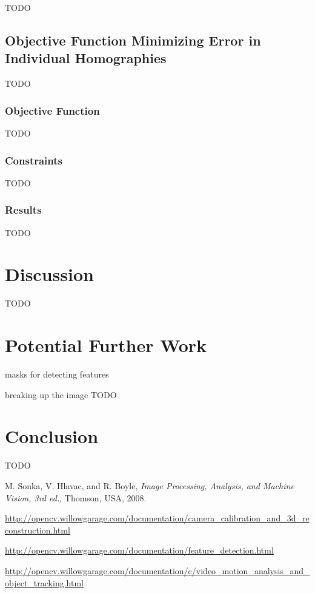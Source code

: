 \documentclass{article}
\begin{document}
TODO

\subsection{Objective Function Minimizing Error in Individual Homographies}

TODO

\subsubsection{Objective Function}

TODO

\subsubsection{Constraints}

TODO

\subsubsection{Results}

TODO

\section{Discussion}

TODO

\section{Potential Further Work}
\label{sec:later}

masks for detecting features

breaking up the image
TODO

\section{Conclusion}

TODO

\begin{thebibliography}{1}

 M. Sonka, V. Hlavac, and R. Boyle, \emph{Image Processing, Analysis, and Machine Vision, 3rd ed.}, Thomson, USA, 2008.

 \url{http://opencv.willowgarage.com/documentation/camera_calibration_and_3d_reconstruction.html}

 \url{http://opencv.willowgarage.com/documentation/feature_detection.html}

 \url{http://opencv.willowgarage.com/documentation/c/video_motion_analysis_and_object_tracking.html}

\end{thebibliography}
\end{document}
